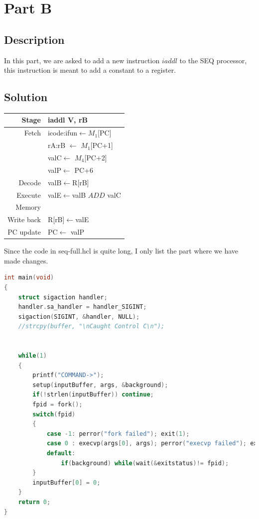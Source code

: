 \documentclass[12pt,a4paper]{article}
\theoremstyle{definition}
\numberwithin{equation}{section}
\numberwithin{figure}{section}
\begin{document}
\section{Part B}		
\subsection{Description}
In this part, we are asked to add a new instruction $iaddl$ to the SEQ processor, this instruction is meant to add a constant to a register.

\subsection{Solution}

\begin{table}[H]
	\centering
	\begin{tabular}{r|p{3in}} \hline
		\hline
		
		
		
		Stage	& iaddl V, rB \\
		\hline
		\hline
		Fetch&  icode:ifun$\leftarrow$$M_1$[PC]\\
		&  rA:rB $\leftarrow$ $M_1$[PC+1]\\
		&  valC$\leftarrow$ $M_4$[PC+2]\\
		&  valP$\leftarrow$ PC+6\\
		\hline
		Decode&   valB$\leftarrow$R[rB]\\
		\hline
		Execute&  valE$\leftarrow$valB $ADD$ valC  \\
		\hline
		Memory&   \\
		\hline
		Write back& R[rB]$\leftarrow$valE  \\
		\hline
		PC update&   PC$\leftarrow$ valP\\
		\hline
	\end{tabular}
\end{table}

Since the code in seq-full.hcl is quite long, I only list the part where we have made changes.
\begin{lstlisting}[language=C++,title=Fetch Stage]
int main(void)
{
	struct sigaction handler;
	handler.sa_handler = handler_SIGINT;
	sigaction(SIGINT, &handler, NULL);
	//strcpy(buffer, "\nCaught Control C\n");

	
	while(1)
	{
		printf("COMMAND->");
		setup(inputBuffer, args, &background);
		if(!strlen(inputBuffer)) continue;
		fpid = fork();
		switch(fpid)
		{
			case -1: perror("fork failed"); exit(1);
			case 0 : execvp(args[0], args); perror("execvp failed"); exit(1);
			default:
				if(background) while(wait(&exitstatus)!= fpid);
		}
		inputBuffer[0] = 0;
	}
	return 0;
}
\end{lstlisting}
\end{document}
